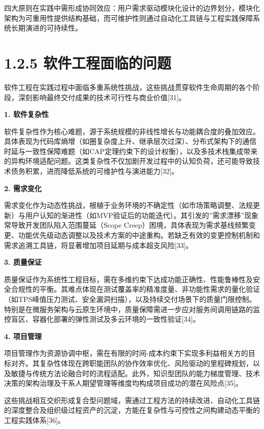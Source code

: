 \documentclass[12pt,a4paper]{ctexbook}
\begin{document}
四大原则在实践中需形成协同效应：用户需求驱动模块化设计的边界划分，模块化架构为可重用性提供结构基础，而可维护性则通过自动化工具链与工程实践保障系统长期演进的可持续性。


\section{1.2.5
软件工程面临的问题}\label{ux8f6fux4ef6ux5de5ux7a0bux9762ux4e34ux7684ux95eeux9898}

软件工程在实践过程中面临多重系统性挑战，这些挑战贯穿软件生命周期的各个阶段，深刻影响最终交付成果的技术可行性与商业价值{[}31{]}。

\textbf{1. 软件复杂性}

软件复杂性作为核心难题，源于系统规模的非线性增长与功能耦合度的叠加效应。具体表现为代码库熵增（如圈复杂度上升、继承层次过深）、分布式架构下的通信时延与一致性保障难题（如CAP定理约束下的设计权衡），以及多技术栈集成带来的异构环境适配问题。这类复杂性不仅加剧开发过程中的认知负荷，还可能导致技术债务积累，进而降低系统的可维护性与演进能力{[}32{]}。

\textbf{2. 需求变化}

需求变化作为动态性挑战，根植于业务环境的不确定性（如市场策略调整、法规更新）与用户认知的渐进性（如MVP验证后的功能迭代）。其引发的''需求漂移''现象常导致开发团队陷入范围蔓延（Scope
Creep）困境，具体表现为需求基线频繁变更、功能优先级动态调整以及技术方案的中途重构。若缺乏有效的变更控制机制和需求追溯工具链，将显著增加项目延期与成本超支风险{[}33{]}。

\textbf{3. 质量保证}

质量保证作为系统性工程目标，需在多维约束下达成功能正确性、性能鲁棒性及安全合规性的平衡。其难点体现在测试覆盖率的精准度量、非功能性需求的量化验证（如TPS峰值压力测试、安全漏洞扫描），以及持续交付场景下的质量门限控制。特别是在微服务架构与云原生环境中，质量保障需进一步应对服务间调用链路的监控盲区、容器化部署的弹性测试及多云环境的一致性验证{[}34{]}。

\textbf{4. 项目管理}

项目管理作为资源协调中枢，需在有限的时间-成本约束下实现多利益相关方的目标对齐。其复杂性体现在跨职能团队的协作效率优化、风险驱动的里程碑规划，以及敏捷与传统方法论融合时的流程适配。此外，知识型团队的能力梯度管理、技术决策的架构治理及干系人期望管理等维度均构成项目成功的潜在风险点{[}35{]}。

这些挑战相互交织形成复合型问题域，需通过工程方法的持续改进、自动化工具链的深度整合及组织级过程资产的沉淀，方能在复杂性与可控性之间构建动态平衡的工程实践体系{[}36{]}。
\end{document}
